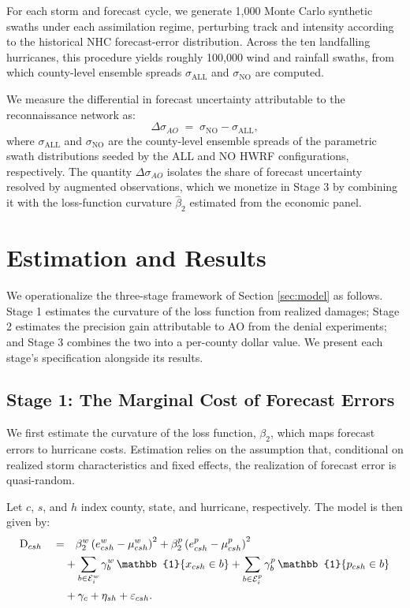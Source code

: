 \documentclass[12pt]{article}%
\begin{document}
For each storm and forecast cycle, we generate 1,000 Monte Carlo synthetic swaths under each assimilation regime, perturbing track and intensity according to the historical NHC forecast-error distribution. Across the ten landfalling hurricanes, this procedure yields roughly 100,000 wind and rainfall swaths, from which county-level ensemble spreads $\sigma_{\text{ALL}}$ and $\sigma_{\text{NO}}$ are computed.

We measure the differential in forecast uncertainty attributable to the reconnaissance network as:
\begin{equation}\label{eq:delta_sigma}
    \Delta \sigma_{AO} \;=\; \sigma_{\text{NO}} - \sigma_{\text{ALL}},
\end{equation}
where $\sigma_{\text{ALL}}$ and $\sigma_{\text{NO}}$ are the county-level ensemble spreads of the parametric swath distributions seeded by the ALL and NO HWRF configurations, respectively. The quantity $\Delta\sigma_{AO}$ isolates the share of forecast uncertainty resolved by augmented observations, which we monetize in Stage 3 by combining it with the loss-function curvature $\hat{\beta}_{2}$ estimated from the economic panel.

\section{Estimation and Results} \label{sec:methods}

We operationalize the three-stage framework of Section \ref{sec:model} as follows. Stage 1 estimates the curvature of the loss function from realized damages; Stage 2 estimates the precision gain attributable to AO from the denial experiments; and Stage 3 combines the two into a per-county dollar value. We present each stage's specification alongside its results.

\subsection{Stage 1: The Marginal Cost of Forecast Errors}

We first estimate the curvature of the loss function, $\beta_{2}$, which maps forecast errors to hurricane costs. Estimation relies on the assumption that, conditional on realized storm characteristics and fixed effects, the realization of forecast error is quasi-random.

Let  $c$, $s$, and $h$ index county, state, and hurricane, respectively. The model is then given by:
\begin{align} \label{eq:stage1_reg}
    \text{D}_{csh} \quad
        =&
        \quad \beta^w_2 \left(e^w_{csh}-\mu^w_{csh}\right)^2 + \beta^p_2 \left(e^p_{csh}-\mu^p_{csh}\right)^2 \notag\\
        &+ \sum_{b \in \mathcal{E}^w_i} \gamma^w_b\, \mathbb{1}\{x_{csh} \in b\} + \sum_{b \in \mathcal{E}^p_i} \gamma^p_b\, \mathbb{1}\{p_{csh} \in b\} \notag\\
        & + \gamma_{c} + \eta_{sh} + \varepsilon_{csh}.
\end{align}
\end{document}
